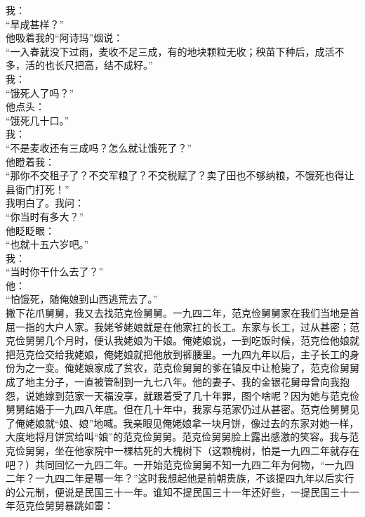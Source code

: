 我：\\

“旱成甚样？”\\

他吸着我的“阿诗玛”烟说：\\

“一入春就没下过雨，麦收不足三成，有的地块颗粒无收；秧苗下种后，成活不多，活的也长尺把高，结不成籽。”\\

我：\\

“饿死人了吗？”\\

他点头：\\

“饿死几十口。”\\

我：\\

“不是麦收还有三成吗？怎么就让饿死了？”\\

他瞪着我：\\

“那你不交租子了？不交军粮了？不交税赋了？卖了田也不够纳粮，不饿死也得让县衙门打死！”\\

我明白了。我问：\\

“你当时有多大？”\\

他眨眨眼：\\

“也就十五六岁吧。”\\

我：\\

“当时你干什么去了？”\\

他：\\

“怕饿死，随俺娘到山西逃荒去了。”\\

撇下花爪舅舅，我又去找范克俭舅舅。一九四二年，范克俭舅舅家在我们当地是首屈一指的大户人家。我姥爷姥娘就是在他家扛的长工。东家与长工，过从甚密；范克俭舅舅几个月时，便认我姥娘为干娘。俺姥娘说，一到吃饭时候，范克俭他娘就把范克俭交给我姥娘，俺姥娘就把他放到裤腰里。一九四九年以后，主子长工的身份为之一变。俺姥娘家成了贫农，范克俭舅舅的爹在镇反中让枪毙了，范克俭舅舅成了地主分子，一直被管制到一九七八年。他的妻子、我的金银花舅母曾向我抱怨，说她嫁到范家一天福没享，就跟着受了几十年罪，图个啥呢？因为她与范克俭舅舅结婚于一九四八年底。但在几十年中，我家与范家仍过从甚密。范克俭舅舅见了俺姥娘就“娘、娘”地喊。我亲眼见俺姥娘拿一块月饼，像过去的东家对她一样，大度地将月饼赏给叫“娘”的范克俭舅舅。范克俭舅舅脸上露出感激的笑容。我与范克俭舅舅，坐在他家院中一棵枯死的大槐树下（这颗槐树，怕是一九四二年就存在吧？）共同回忆一九四二年。一开始范克俭舅舅不知一九四二年为何物，“一九四二年？一九四二年是哪一年？”这时我想起他是前朝贵族，不该提四九年以后实行的公元制，便说是民国三十一年。谁知不提民国三十一年还好些，一提民国三十一年范克俭舅舅暴跳如雷：\\


